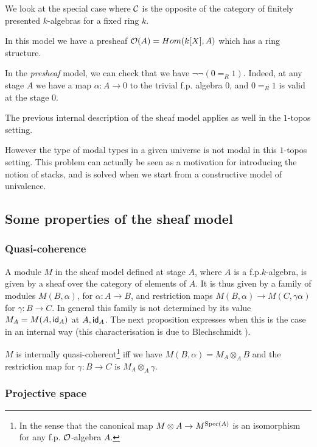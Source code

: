 We look at the special case where $\mathcal{C}$ is the opposite of the category of finitely presented $k$-algebras for a fixed
ring $k$.

    In this model we have a presheaf $\mathcal O(A) = Hom(k[X],A)$ which has a ring structure.

    In the {\em presheaf} model, we can check that we have $\neg\neg (0=_R 1)$. Indeed, at any stage $A$ we have
    a map $\alpha:A\rightarrow 0$ to the trivial f.p. algebra $0$, and $0 =_R 1$ is valid at the stage $0$.

    The previous internal description of the sheaf model applies as well in the $1$-topos setting.

    \medskip

    However the type of modal types in a given universe is not modal in this $1$-topos setting. This problem can actually be seen as a
    motivation for introducing the notion of stacks, and is solved when we start from a constructive model of univalence.

    \subsection{Some properties of the sheaf model}

    \subsubsection{Quasi-coherence}

A module $M$ in the sheaf model defined at stage $A$, where $A$ is a f.p.\@ $k$-algebra, is given by a sheaf over the category
of elements of $A$. It is thus given by a family of modules $M(B,\alpha)$, for $\alpha:A\rightarrow B$, and restriction maps
$M(B,\alpha)\rightarrow M(C,\gamma\alpha)$ for $\gamma:B\rightarrow C$. In general this family is not determined by
its value $M_A = M(A,\mathsf{id}_A)$ at $A,\mathsf{id}_A$. The next proposition expresses when this is the case in an internal way
(this characterisation is due to Blechschmidt \cite{ingo-thesis}).

\begin{proposition}
  $M$ is internally quasi-coherent\footnote{In the sense that the canonical map $M\otimes A\rightarrow M^{\operatorname{Spec}(A)}$ is an isomorphism for any
  f.p. $\mathcal O$-algebra $A$.} iff we have $M(B,\alpha) = M_A\otimes_A B$ and the restriction map for
  $\gamma:B\rightarrow C$ is $M_A\otimes_A\gamma$.
\end{proposition}

    \subsubsection{Projective space}

